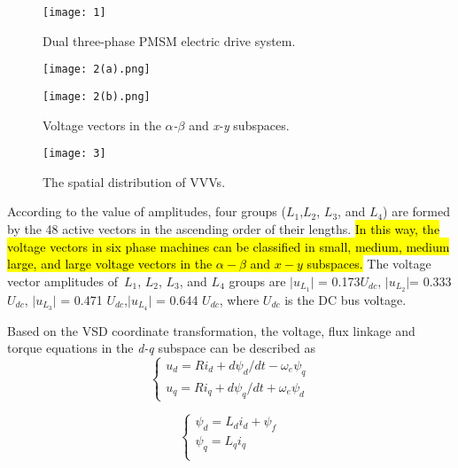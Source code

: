 \documentclass[sn-basic]{sn-jnl}
\theoremstyle{thmstyleone}%
\theoremstyle{thmstyletwo}%
\theoremstyle{thmstylethree}%
\theoremstyle{thmstyleone}%
\begin{document}
\begin{figure}[h]%
\centering
\texttt{[image: 1]}
\caption{Dual three-phase PMSM electric drive system.}\label{fig1}
\end{figure}





\begin{figure}[h]
	\centering
	\begin{minipage}{0.49\linewidth}
		\centering
		\texttt{[image: 2(a).png]}
	\end{minipage}
	\begin{minipage}{0.49\linewidth}
		\centering
		\texttt{[image: 2(b).png]}
	\end{minipage}
 \caption{Voltage vectors in the \textit{$\alpha$-$\beta$} and \textit{x-y} subspaces.}
 \label{fig_2}
\end{figure}

\begin{figure}[h]
\centering
\texttt{[image: 3]}
\caption{The spatial distribution of VVVs.}
\label{fig_3}
\end{figure}


According to the value of amplitudes, four groups ($L_1$,$L_2$, $L_3$, and $L_4$) are formed by the 48 active vectors in the ascending order of their lengths. \hl{In this way, the voltage vectors in six phase machines can be classified in small, medium, medium large, and large voltage vectors in the $\alpha-\beta$ and $x-y$ subspaces.} The voltage vector amplitudes of~$L_1$, $L_2$, $L_3$, and $L_4$ groups are $\mid$$u_{L_1}$$\mid$ = 0.173$U_{dc}$, $\mid$$u_{L_2}$$\mid $= 0.333 $U_{dc}$, $\mid$$u_{L_3}$$\mid$ = 0.471 $U_{dc}$,$ \mid$$u_{L_4}$$\mid$ = 0.644 $U_{dc}$, where $U_{dc}$ is the DC bus voltage.

Based on the VSD coordinate transformation, the voltage, flux linkage and torque equations in the \textit{d-q}  subspace can be described as
\begin{equation}\label{eq1}
\left\{\begin{array}{l}
u_{d}=R i_{d}+d \psi_{d} / d t-\omega_{e} \psi_{q} \\
u_{q}=R i_{q}+d \psi_{q} / d t+\omega_{e} \psi_{d}
\end{array}\right.
\end{equation}

\begin{equation}
\left\{ \begin{matrix}
{\psi_{d} = L_{d}i_{d} + \psi_{f}} \\
{\psi_{q} = L_{q}i_{q}} \\
\end{matrix} \right.
\end{equation}
\end{document}
